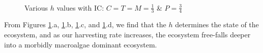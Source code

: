 \documentclass[12pt]{article}
\begin{document}
\begin{figure}[H]%
    \centering
    \quad
    \\
    \quad
    \caption{Various $h$ values with IC: $C=T=M=\frac{1}{3}$ \& $P = \frac{3}{4}$}%
    \label{fig:h_graphs}%
\end{figure}
From Figures \ref{fig:h_graphs}.a, \ref{fig:h_graphs}.b, \ref{fig:h_graphs}.c, and \ref{fig:h_graphs}.d, we find that the $h$ determines the state of the ecosystem, and as our harvesting rate increases, the ecosystem free-falls deeper into a morbidly macroalgae dominant ecosystem.\\
\end{document}
